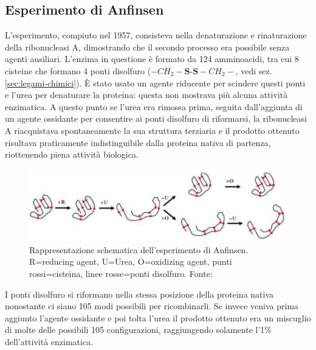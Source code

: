 {\subsection{Esperimento di Anfinsen}
{
L'esperimento, compiuto nel 1957\supercite{anfinsen1961kinetics}, consisteva nella denaturazione e rinaturazione della ribonucleasi A, dimostrando che il secondo processo era possibile senza agenti ausiliari. L'enzima in questione è formato da 124 amminoacidi, tra cui 8 cisteine che formano 4 ponti disolfuro ($-CH_{2}-\textbf{S-S}-CH_{2}-$, vedi sez. \ref{sec:legami-chimici}). È stato usato un agente riducente per scindere questi ponti e l'urea per denaturare la proteina: questa non mostrava più alcuna attività enzimatica. A questo punto se l'urea era rimossa prima, seguita dall'aggiunta di un agente ossidante per consentire ai ponti disolfuro di riformarsi, la ribonucleasi A riacquistava spontaneamente la sua struttura terziaria e il prodotto ottenuto risultava praticamente indistinguibile dalla proteina nativa di partenza, riottenendo piena attività biologica. 

\begin{figure}[h]
	\centering
	\includegraphics[scale=0.6]{images/anfinsen-experiment.png}
	\caption{Rappresentazione schematica dell'esperimento di Anfinsen. R=reducing agent, U=Urea, O=oxidizing agent, punti rossi=cisteina, linee rosse=ponti disolfuro. Fonte: \cite{pal2019fundamentals}}
	\label{fig:anfinsen-exp}
\end{figure}

I ponti disolfuro si riformano nella stessa posizione della proteina nativa nonostante ci siano 105 modi possibili per ricombinarli. Se invece veniva prima aggiunto l'agente ossidante e poi tolta l'urea il prodotto ottenuto era un miscuglio di molte delle possibili 105 configurazioni, raggiungendo solamente l'1\% dell'attività enzimatica.

}}
